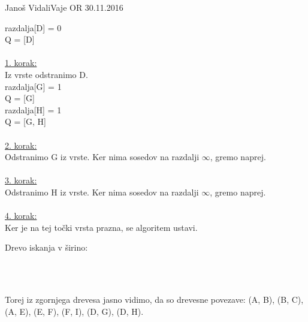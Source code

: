\begin{naloga}{Janoš Vidali}{Vaje OR 30.11.2016}
\begin{odgovor}
razdalja[D] = 0\\
Q = [D]\\
\\
\underline{1. korak:}\\
Iz vrste odstranimo D.\\
razdalja[G] = 1\\
Q = [G]\\
razdalja[H] = 1\\
Q = [G, H]\\
\\
\underline{2. korak:}\\
Odstranimo G iz vrste. Ker nima sosedov na razdalji $\infty$, gremo naprej.\\
\\
\underline{3. korak:}\\
Odstranimo H iz vrste. Ker nima sosedov na razdalji $\infty$, gremo naprej.\\
\\
\underline{4. korak:}\\
Ker je na tej točki vrsta prazna, se algoritem ustavi.
\newpage
\begin{flushleft}
Drevo iskanja v širino: 
\end{flushleft}
\\
\\
\begin{flushleft}
Torej iz zgornjega drevesa jasno vidimo, da so drevesne povezave: (A, B), (B, C), (A, E), (E, F), (F, I), (D, G), (D, H).
\end{flushleft}

\end{odgovor}
\end{naloga}
